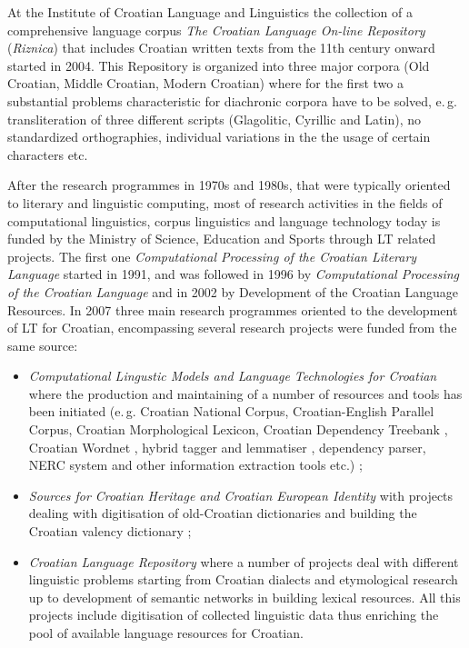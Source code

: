 \begin{multicols}{2}
At the Institute of Croatian Language and Linguistics the collection of a comprehensive language corpus \emph{The Croatian Language On-line Repository} (\emph{Riznica})  \cite{str29, pro11} that includes Croatian written texts from the 11th century onward started in 2004. This Repository is organized into three major corpora (Old Croatian, Middle Croatian, Modern Croatian) where for the first two a substantial problems characteristic for diachronic corpora have to be solved, e.\,g. transliteration of three different scripts (Glagolitic, Cyrillic and Latin), no standardized orthographies, individual variations in the the usage of certain characters etc.

After the research programmes in 1970s and 1980s, that were typically oriented  to literary and linguistic computing, most of research activities in the fields of computational linguistics, corpus linguistics and language technology today is funded by the Ministry of Science, Education and Sports through LT related projects. The first one \emph{Computational Processing of the Croatian Literary Language} started in 1991, and was followed in 1996 by \emph{Computational Processing of the Croatian Language} and in 2002 by Development of the Croatian Language Resources. In 2007 three main research programmes oriented to the development of LT for Croatian, encompassing several research projects were funded from the same source:

\begin{itemize}
\item \emph{Computational Lingustic Models and Language Technologies for Croatian} \cite{str30} where the production and maintaining of a number of resources and tools has been initiated (e.\,g. Croatian National Corpus, Croatian-English Parallel Corpus, Croatian Morphological Lexicon, Croatian Dependency Treebank \cite{str31}, Croatian Wordnet \cite{str32}, hybrid tagger \cite{art8} and lemmatiser \cite{pro12}, dependency parser, NERC system and other information extraction tools \cite{str33} etc.) ;
\item \emph{Sources for Croatian Heritage and Croatian European Identity} \cite{str34} with projects dealing with digitisation of old-Croatian dictionaries and building the Croatian valency dictionary \cite{art9}; 
\item \emph{Croatian Language Repository} \cite{str29} where a number of projects deal with different linguistic problems starting from Croatian dialects and etymological research up to development of semantic networks in building lexical resources. All this projects include digitisation of collected linguistic data thus enriching the pool of available language resources for Croatian. 
\end{itemize}


\end{multicols}
